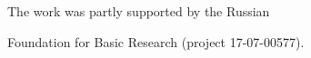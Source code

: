  















\Ack


\noindent


The work was partly supported by the Russian 


Foundation for Basic Research (project 17-07-00577).








\renewcommand{\bibname}{\protect\rmfamily References}







